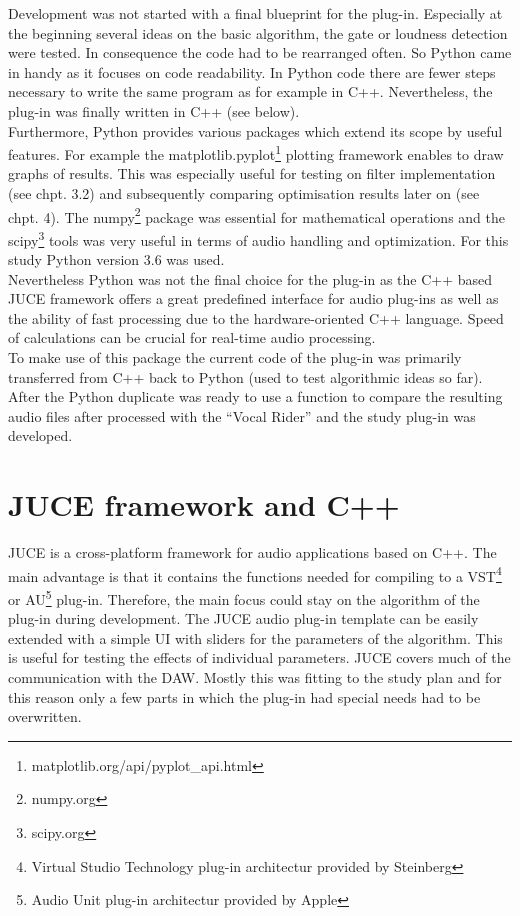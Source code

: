 Development was not started with a final blueprint for the plug-in. Especially at the beginning several ideas on the basic algorithm, the gate or loudness detection were tested. In consequence the code had to be rearranged often. So Python came in handy as it focuses on code readability. In Python code there are fewer steps necessary to write the same program as for example in C++. Nevertheless, the plug-in was finally written in C++ (see below).\\
Furthermore, Python provides various packages which extend its scope by useful features. For example the matplotlib.pyplot\footnote{matplotlib.org/api/pyplot\_api.html} plotting framework enables to draw graphs of results. This was especially useful for testing on filter implementation (see chpt. 3.2) and subsequently comparing optimisation results later on (see chpt. 4). The numpy\footnote{numpy.org} package was essential for mathematical operations and the scipy\footnote{scipy.org} tools was very useful in terms of audio handling and optimization. For this study Python version 3.6 was used.\\
Nevertheless Python was not the final choice for the plug-in as the C++ based JUCE framework offers a great predefined interface for audio plug-ins as well as the ability of fast processing due to the hardware-oriented C++ language. Speed of calculations can be crucial for real-time audio processing.\\

To make use of this package the current code of the plug-in was primarily transferred from C++ back to Python (used to test algorithmic ideas so far). After the Python duplicate was ready to use a function to compare the resulting audio files after processed with the “Vocal Rider” and the study plug-in was developed.

\section{JUCE framework and C++}

JUCE is a cross-platform framework for audio applications based on C++. The main advantage is that it contains the functions needed for compiling to a VST\footnote{Virtual Studio Technology plug-in architectur provided by Steinberg} or AU\footnote{Audio Unit plug-in architectur provided by Apple} plug-in. Therefore, the main focus could stay on the algorithm of the plug-in during development. The JUCE audio plug-in template can be easily extended with a simple UI with sliders for the parameters of the algorithm. This is useful for testing the effects of individual parameters. JUCE covers much of the communication with the DAW. Mostly this was fitting to the study plan and for this reason only a few parts in which the plug-in had special needs had to be overwritten.\\

